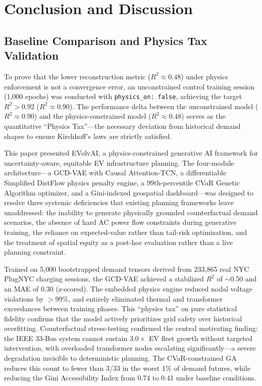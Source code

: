 \documentclass[conference]{IEEEtran}
\begin{document}
\section{Conclusion and Discussion}

\subsection{Baseline Comparison and Physics Tax Validation}
To prove that the lower reconstruction metric ($R^2 \approx 0.48$) under physics enforcement is not a convergence error, an unconstrained control training session (1,000 epochs) was conducted with \texttt{physics\_on: false}, achieving the target $R^2 > 0.92$ ($R^2 \approx 0.90$). The performance delta between the unconstrained model ($R^2 \approx 0.90$) and the physics-constrained model ($R^2 \approx 0.48$) serves as the quantitative ``Physics Tax''---the necessary deviation from historical demand shapes to ensure Kirchhoff's laws are strictly satisfied.

This paper presented EVolvAI, a physics-constrained generative AI framework for uncertainty-aware, equitable EV infrastructure planning. The four-module architecture---a GCD-VAE with Causal Attention-TCN, a differentiable Simplified DistFlow physics penalty engine, a 99th-percentile CVaR Genetic Algorithm optimizer, and a Gini-indexed geospatial dashboard---was designed to resolve three systemic deficiencies that existing planning frameworks leave unaddressed: the inability to generate physically grounded counterfactual demand scenarios, the absence of hard AC power flow constraints during generative training, the reliance on expected-value rather than tail-risk optimization, and the treatment of spatial equity as a post-hoc evaluation rather than a live planning constraint.

Trained on 5{,}000 bootstrapped demand tensors derived from 233{,}865 real NYC PlugNYC charging sessions, the GCD-VAE achieved a stabilized $R^2$ of $\sim$0.50 and an MAE of 0.30 (z-scored). The embedded physics engine reduced nodal voltage violations by $>$99\%, and entirely eliminated thermal and transformer exceedances between training phases. This ``physics tax'' on pure statistical fidelity confirms that the model actively prioritizes grid safety over historical overfitting. Counterfactual stress-testing confirmed the central motivating finding: the IEEE 33-Bus system cannot sustain $3.0\times$ EV fleet growth without targeted intervention, with overloaded transformer nodes escalating significantly---a severe degradation invisible to deterministic planning. The CVaR-constrained GA reduces this count to fewer than 3/33 in the worst 1\% of demand futures, while reducing the Gini Accessibility Index from 0.74 to 0.41 under baseline conditions.
\end{document}
